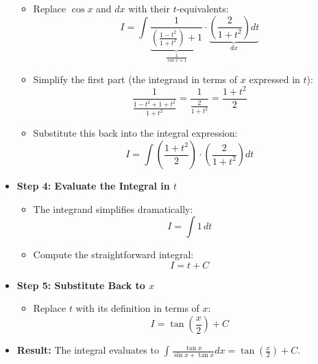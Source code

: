 \begin{cascade}
\begin{itemize}
\begin{itemize}
			      \item Replace $\cos x$ and $dx$ with their $t$-equivalents:
			            \[ I = \int \underbrace{\frac{1}{\left(\frac{1-t^2}{1+t^2}\right) + 1}}_{\frac{1}{\cos x + 1}} \cdot \underbrace{\left(\frac{2}{1+t^2}\right) dt}_{dx} \]
			      \item Simplify the first part (the integrand in terms of $x$ expressed in $t$):
			            \[ \frac{1}{\frac{1-t^2 + 1+t^2}{1+t^2}} = \frac{1}{\frac{2}{1+t^2}} = \frac{1+t^2}{2} \]
			      \item Substitute this back into the integral expression:
			            \[ I = \int \left(\frac{1+t^2}{2}\right) \cdot \left(\frac{2}{1+t^2}\right) dt \]
		      \end{itemize}
		\item \textbf{Step 4: Evaluate the Integral in $t$}
		      \begin{itemize}
			      \item The integrand simplifies dramatically:
			            \[ I = \int 1 \, dt \]
			      \item Compute the straightforward integral:
			            \[ I = t + C \]
		      \end{itemize}
		\item \textbf{Step 5: Substitute Back to $x$}
		      \begin{itemize}
			      \item Replace $t$ with its definition in terms of $x$:
			            \[ I = \tan\left(\frac{x}{2}\right) + C \]
		      \end{itemize}
		\item \textbf{Result:} The integral evaluates to $\int \frac{\tan x}{\sin x + \tan x} dx = \tan\left(\frac{x}{2}\right) + C$.
	\end{itemize}
\end{cascade}

\hfill

